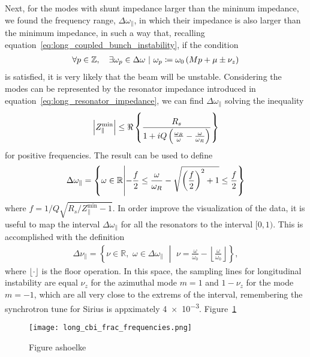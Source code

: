     Next, for the modes with shunt impedance larger than the mininum impedance, we found the frequency range, $\Delta\omega_\parallel$, in which their impedance is also larger than the minimum impedance, in such a way that, recalling equation~\eqref{eq:long_coupled_bunch_instability}, if the condition
    \begin{align}
        \left.\forall p \in \mathbb{Z},\quad \exists \omega_p \in \Delta \omega \,\, \middle| \,\, \omega_p \coloneqq \omega_0\left(Mp + \mu \pm \nu_z\right)\right.
    \end{align}
    is satisfied, it is very likely that the beam will be unstable. Considering the modes can be represented by the resonator impedance introduced in equation~\eqref{eq:long_resonator_impedance}, we can find $\Delta\omega_\parallel$ solving the inequality
    \begin{align}
        \left|Z_\parallel^\text{min}\right| \le \Re\left\{\frac{R_s}{1 + iQ\left(\frac{\omega_R}{\omega}-\frac{\omega}{\omega_R}\right)}\right\}
    \end{align}
    for positive frequencies. The result can be used to define
    \begin{align}
        \Delta\omega_\parallel = \left\{\omega \in \mathbb{R} \middle| -\frac{f}{2} \le \frac{\omega}{\omega_R} - \sqrt{\left(\frac{f}{2}\right)^2+1} \le
        \frac{f}{2} \right\}
    \end{align}
    where $f = 1/Q\sqrt{R_s/Z_\parallel^\text{min}-1}$. In order improve the visualization of the data, it is useful to map the interval $\Delta\omega_\parallel$ for all the resonators to the interval $[0,1)$. This is accomplished with the definition
    \begin{align}\label{eq:cbi_frac_frequencies}
        \Delta\nu_\parallel = \left\{\nu \in \mathbb{R},\,\,\omega \in \Delta\omega_\parallel\,\, \middle|\,\,
        \nu=\frac{\omega}{\omega_0} - \left\lfloor\frac{\omega}{\omega_0}\right\rfloor \right\},
    \end{align}
    where $\lfloor\cdot\rfloor$ is the floor operation. In this space, the sampling lines for longitudinal instability are equal $\nu_z$ for the azimuthal mode $m=1$ and $1 - \nu_z$ for the mode $m=-1$, which are all very close to the extrems of the interval, remembering the synchrotron tune for Sirius is appximately \SI{4e-3}{}.
    Figure~\ref{fig:long_cbi_frac_frequencies}
    \begin{figure}
        \centering
        \texttt{[image: long\_cbi\_frac\_frequencies.png]}
        \caption{Figure ashoelke}
        \label{fig:long_cbi_frac_frequencies}
    \end{figure}
